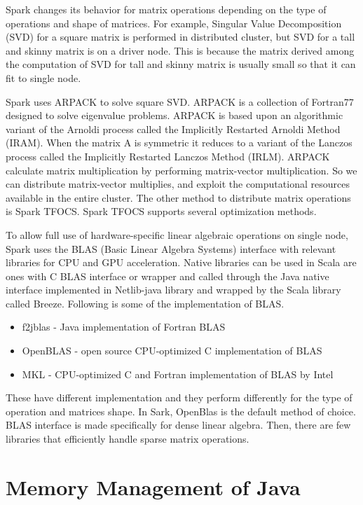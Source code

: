 Spark changes its behavior for matrix operations depending on the type of operations and shape of matrices. For example, Singular Value Decomposition (SVD) for a square matrix is performed in distributed cluster, 
but SVD for a tall and skinny matrix is on a driver node. This is because the matrix derived among the computation of SVD for tall and skinny matrix is usually small so that it can fit to single node.

Spark uses ARPACK to solve square SVD. ARPACK is a collection of Fortran77 designed to solve eigenvalue problems. ARPACK is based upon an algorithmic variant of the Arnoldi process called the Implicitly Restarted Arnoldi Method (IRAM). 
When the matrix A is symmetric it reduces to a variant of the Lanczos process called the Implicitly Restarted Lanczos Method (IRLM). 
ARPACK calculate matrix multiplication by performing matrix-vector multiplication. So we can distribute matrix-vector multiplies, and exploit the computational resources available in the entire cluster. 
The other method to distribute matrix operations is Spark TFOCS. Spark TFOCS supports several optimization methods.

To allow full use of hardware-specific linear algebraic operations on single node, Spark uses the BLAS (Basic Linear Algebra Systems) interface with relevant libraries for CPU and GPU acceleration. 
Native libraries can be used in Scala are ones with C BLAS interface or wrapper and called through the Java native interface implemented in Netlib-java library and wrapped by the Scala library called Breeze. 
Following is some of the implementation of BLAS.

\begin{itemize}
    \item f2jblas -  Java implementation of Fortran BLAS
    \item OpenBLAS - open source CPU-optimized C implementation of BLAS
    \item MKL - CPU-optimized C and Fortran implementation of BLAS by Intel
\end{itemize}

These have different implementation and they perform differently for the type of operation and matrices shape. 
In Sark, OpenBlas is the default method of choice. BLAS interface is made specifically for dense linear algebra. 
Then, there are few libraries that efficiently handle sparse matrix operations.


\section{Memory Management of Java}
\label{sec:history}

